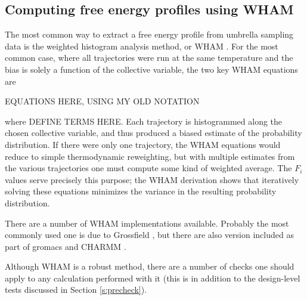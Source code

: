 
\subsection{Computing free energy profiles using WHAM}

The most common way to extract a free energy profile from umbrella sampling data
is the weighted histogram analysis method, or WHAM \cite{Swendsen-1995, Roux-1995, Swendsen-1992}.
For the most common case, where all
trajectories were run at the same temperature and the bias is solely a function
of the collective variable, the two key WHAM equations are

EQUATIONS HERE, USING MY OLD NOTATION

where DEFINE TERMS HERE. Each trajectory is histogrammed along the chosen
collective variable, and thus produced a biased estimate of the probability
distribution. If there were only one trajectory, the WHAM equations would reduce
to simple thermodynamic reweighting, but with multiple estimates from the
various trajectories one must compute some kind of weighted average.  The  $F_i$
values serve precisely this purpose; the WHAM derivation shows that iteratively
solving these equations minimizes the variance in the resulting probability
distribution.

There are a number of WHAM implementations available.  Probably the most commonly used one is due to Grossfield \cite{WHAM}, but there are also version included as part of gromacs \cite{Lindahl-2013} and CHARMM \cite{CHARMM2009}.

Although WHAM is a robust method, there are a number of checks one should apply
to any calculation performed with it (this is in addition to the design-level
tests discussed in Section \ref{s:precheck}).

